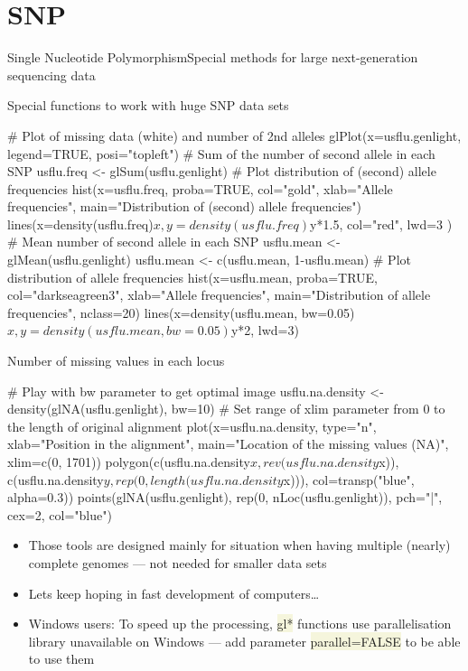 \documentclass[compress, ucs, xelatex, 11pt, xcolor=svgnames, aspectratio=169,
	hyperref={
		bookmarks=true,
		unicode=true,
		colorlinks=true,
		pdftitle={Molecular data in R},
		plainpages=false,
		pdfauthor={Vojtech Zeisek},
		pdfsubject={Course about phylogeny and evolution in R},
		pdfcreator={XeLaTeX},
		pdfkeywords={R, evolution, phylogeny, molecular data},
		linkcolor=Crimson, %
		anchorcolor=Magenta, %
		citecolor=Magenta, %
		filecolor=Magenta, %
		menucolor=Magenta, %
		urlcolor=DodgerBlue, %
		pdftex},
	url={hyphens, lowtilde} %
	]{beamer}
\renewcommand{\texttt}[1]{\colorbox{Beige}{{\ttfamily #1}}}
\begin{document}
\section{SNP}

\begin{frame}{Single Nucleotide Polymorphism}{Special methods for large next-generation sequencing data}
	\tableofcontents[currentsection, sectionstyle=show/hide, hideothersubsections]
\end{frame}

\begin{frame}[fragile]{Special functions to work with huge SNP data sets}
	\begin{spluscode}
    # Plot of missing data (white) and number of 2nd alleles
    glPlot(x=usflu.genlight, legend=TRUE, posi="topleft")
    # Sum of the number of second allele in each SNP
    usflu.freq <- glSum(usflu.genlight)
    # Plot distribution of (second) allele frequencies
    hist(x=usflu.freq, proba=TRUE, col="gold", xlab="Allele frequencies",
      main="Distribution of (second) allele frequencies")
    lines(x=density(usflu.freq)$x, y=density(usflu.freq)$y*1.5, col="red",
      lwd=3 )
    # Mean number of second allele in each SNP
    usflu.mean <- glMean(usflu.genlight)
    usflu.mean <- c(usflu.mean, 1-usflu.mean)
    # Plot distribution of allele frequencies
    hist(x=usflu.mean, proba=TRUE, col="darkseagreen3", xlab="Allele
      frequencies", main="Distribution of allele frequencies", nclass=20)
    lines(x=density(usflu.mean, bw=0.05)$x, y=density(usflu.mean, bw=0.05)$y*2,
      lwd=3)
	\end{spluscode}
\end{frame}

\begin{frame}[fragile]{Number of missing values in each locus}
	\begin{spluscode}
    # Play with bw parameter to get optimal image
    usflu.na.density <- density(glNA(usflu.genlight), bw=10)
    # Set range of xlim parameter from 0 to the length of original alignment
    plot(x=usflu.na.density, type="n", xlab="Position in the alignment",
      main="Location of the missing values (NA)", xlim=c(0, 1701))
    polygon(c(usflu.na.density$x, rev(usflu.na.density$x)),
      c(usflu.na.density$y, rep(0, length(usflu.na.density$x))),
      col=transp("blue", alpha=0.3))
    points(glNA(usflu.genlight), rep(0, nLoc(usflu.genlight)), pch="|", cex=2,
      col="blue")
	\end{spluscode}
	\begin{itemize}
		\item Those tools are designed mainly for situation when having multiple (nearly) complete genomes --- not needed for smaller data sets
		\item Lets keep hoping in fast development of computers\ldots
		\item \alert{Windows users:} To speed up the processing, \texttt{gl*} functions use parallelisation library unavailable on Windows --- add parameter \texttt{parallel=FALSE} to be able to use them
	\end{itemize}
\end{frame}
\end{document}
